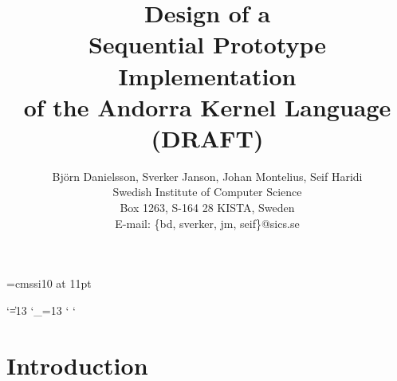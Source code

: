 
\font\ssi=cmssi10 at 11pt

\def\inp{\ssi}

\begingroup
\catcode`\|=13
\catcode`\_=13
\catcode`
\catcode`

\gdef\prog{\sf%
\catcode`\|=13%
\def|{{\tt \char`|}}%
\catcode`\_=13%
\def_{{\tt \char`_}}%
\catcode`\<=13%
\def<{{\tt \char`\<}}%
\catcode`\>=13%
\def>{{\tt \char`\>}}%
}
\endgroup

\def\sub#1{$#1$}

\newenvironment{program}{%
\begingroup%
\prog%
\def\nl{\\[\medskipamount]}%
\begin{tabbing}%
\hskip1cm\=\hskip1cm\=\hskip1cm\=\hskip1cm\=\kill}{%
\end{tabbing}\endgroup\noindent}

\def\pdef{\mathrel{\mbox{:-}}}
\def\rewriteto{\Rightarrow}
\def\transit{\rightarrow}
\def\AND{\mbox{\bf and}}
\def\OR{\mbox{\bf or}}
\def\CHOICE{\mbox{\bf choice}}
\def\TRUE{\mbox{\bf true}}
\def\FAIL{\mbox{\bf fail}}
\def\FALSE{\mbox{\bf false}}
\def\wait{\mathrel{\mbox{:}}}
\def\cut{\mathrel{\mbox{!}}}
\def\commit{\mid}
\def\guard{\mathrel{\mbox{\%}}}
\def\AGGREGATE{\mbox{\bf aggregate}}
\def\BAGOF{\mbox{\bf bagof}}
\def\nt#1{\langle\mbox{\em #1\/}\rangle}
\def\bnf{\mathrel{::=}}
\def\logand{\mathrel{\&}}
\def\implies{\supset}

\def\instruction#1{\medskip\noindent{\bf #1}}

\title{Design of a\\
Sequential Prototype Implementation\\
of the Andorra Kernel Language\\
(DRAFT)}

\author{Bj\"orn Danielsson, Sverker Janson, Johan Montelius, Seif Haridi\vspace{0.3cm}\\
Swedish Institute of Computer Science\\
Box 1263, S-164 28 KISTA, Sweden\\
E-mail: \{bd, sverker, jm, seif\}@sics.se}



\maketitle

\tableofcontents

\chapter{Introduction} \label{ch:intro}

